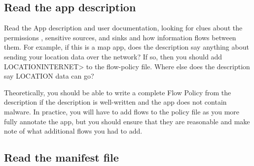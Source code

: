 \subsection{Read the app description}
\label{sec:read-the-app-description}

Read the App description and user documentation, looking for clues about
the permissions , sensitive sources, and sinks and how information
flows between them.  For example,
if this is a map app, does the description say anything about sending your location data over the
 network?  If so, then you should add \<LOCATION\flowsto INTERNET> to the flow-policy file.  Where
else does the description say LOCATION data can go?   

Theoretically, you should be able to write a complete Flow Policy from the
description if the description is well-written and the app does not contain
malware.  In practice, you will have to add flows to the policy file as you
more fully annotate the app, but you should ensure that they are reasonable
and make note of what additional flows you had to add.
 

\subsection{Read the manifest file}

